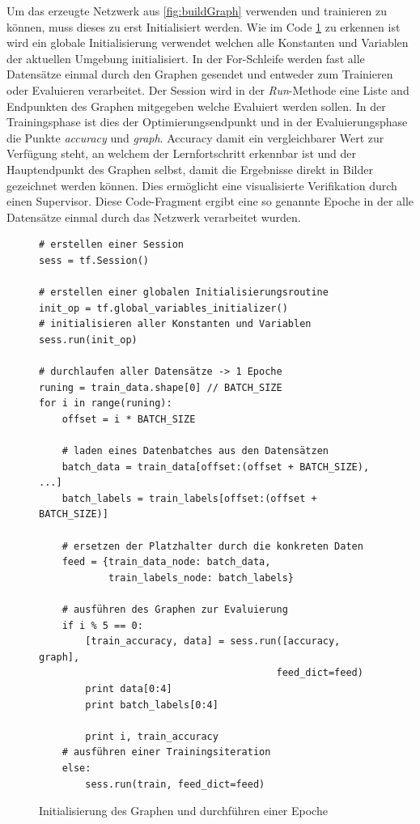 Um das erzeugte Netzwerk aus \ref{fig:buildGraph} verwenden und trainieren zu können, muss dieses zu erst Initialisiert werden. 
Wie im Code \ref{fig:initRun} zu erkennen ist wird ein globale Initialisierung verwendet welchen alle Konstanten und Variablen der aktuellen Umgebung initialisiert. 
In der For-Schleife werden fast alle Datensätze einmal durch den Graphen gesendet und entweder zum Trainieren oder Evaluieren verarbeitet. 
Der Session wird in der \textit{Run}-Methode eine Liste and Endpunkten des Graphen mitgegeben welche Evaluiert werden sollen. 
In der Trainingsphase ist dies der Optimierungsendpunkt und in der Evaluierungsphase die Punkte \textit{accuracy} und \textit{graph}. 
Accuracy damit ein vergleichbarer Wert zur Verfügung steht, an welchem der Lernfortschritt erkennbar ist und der Hauptendpunkt des Graphen selbst, damit die Ergebnisse direkt in Bilder gezeichnet werden können. 
Dies ermöglicht eine visualisierte Verifikation durch einen Supervisor. 
Diese Code-Fragment ergibt eine so genannte Epoche in der alle Datensätze einmal durch das Netzwerk verarbeitet wurden. 
\begin{figure}[ht!]
\lstset{language=Python}
\begin{lstlisting}
# erstellen einer Session
sess = tf.Session()

# erstellen einer globalen Initialisierungsroutine
init_op = tf.global_variables_initializer()
# initialisieren aller Konstanten und Variablen
sess.run(init_op)

# durchlaufen aller Datensätze -> 1 Epoche
runing = train_data.shape[0] // BATCH_SIZE
for i in range(runing):
    offset = i * BATCH_SIZE
    
    # laden eines Datenbatches aus den Datensätzen
    batch_data = train_data[offset:(offset + BATCH_SIZE), ...]
    batch_labels = train_labels[offset:(offset + BATCH_SIZE)]
    
    # ersetzen der Platzhalter durch die konkreten Daten
    feed = {train_data_node: batch_data, 
            train_labels_node: batch_labels}
     
    # ausführen des Graphen zur Evaluierung
    if i % 5 == 0:
        [train_accuracy, data] = sess.run([accuracy, graph], 
        								 feed_dict=feed)
        print data[0:4]
        print batch_labels[0:4]
        
        print i, train_accuracy
    # ausführen einer Trainingsiteration
    else:
        sess.run(train, feed_dict=feed)
\end{lstlisting}
	\caption{Initialisierung des Graphen und durchführen einer Epoche}
	\label{fig:initRun}
\end{figure}

